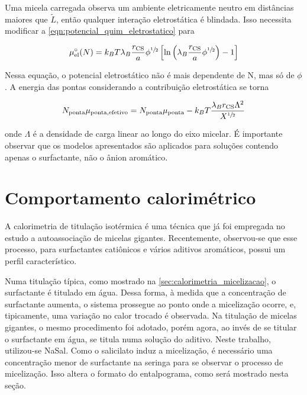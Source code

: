 		Uma micela carregada observa um ambiente eletricamente neutro em distâncias maiores que \(\tilde{L}\), então qualquer interação eletrostática é blindada. Isso necessita modificar a \autoref{eqn:potencial_quim_eletrostatico} para \cite{Giant_Micelles}
		
		\begin{equation}
			\mu_\mathrm{el}^\circ(N) = k_B T \lambda_B \dfrac{r_\mathrm{CS}}{a} \phi^{\sfrac{1}{2}} \left[ \ln \left( \lambda_B \dfrac{r_\mathrm{CS}}{a} \phi^{\sfrac{1}{2}} \right) - 1 \right]
			\label{eqn:potencial_eletrostatico_semidiluido}
		\end{equation}
		
		Nessa equação, o potencial eletrostático não é mais dependente de N, mas só de \(\phi\). A energia das pontas considerando a contribuição eletrostática se torna \cite{Giant_Micelles}
		
		\begin{equation}
			N_\mathrm{ponta}\mu_\mathrm{ponta, efetivo} = N_\mathrm{ponta}\mu_\mathrm{ponta} - k_B T \dfrac{\lambda_B r_\mathrm{CS} \Lambda^2}{X^{\sfrac{1}{2}}}
		\end{equation} 
		
		\noindent onde \(\Lambda\) é a densidade de carga linear ao longo do eixo micelar. É importante observar que os modelos apresentados são aplicados para soluções contendo apenas o surfactante, não o ânion aromático.
		

		\section{Comportamento calorimétrico} 
		\label{sec:micelas_gigantes_calorimetria}
		
		A calorimetria de titulação isotérmica é uma técnica que já foi empregada no estudo a autoassociação de micelas gigantes.\cite{Sarac2009, Sarac2013, Liu2011a, Bijma1998c, Fisicaro2005a} Recentemente, observou-se que esse processo, para surfactantes catiônicos e vários aditivos aromáticos, possui um perfil característico.\cite{Ito2016, Ito2015c}

		Numa titulação típica, como mostrado na \autoref{sec:calorimetria_micelizacao}, o surfactante é titulado em água. Dessa forma, à medida que a concentração de surfactante aumenta, o sistema prossegue ao ponto onde a micelização ocorre, e, tipicamente, uma variação no calor trocado é observada. Na titulação de micelas gigantes, o mesmo procedimento foi adotado, porém agora, ao invés de se titular o surfactante em água, se titula numa solução do aditivo. Neste trabalho, utilizou-se NaSal. Como o salicilato induz a micelização, é necessário uma concentração menor de surfactante na seringa para se observar o processo de micelização. Isso altera o formato do entalpograma, como será mostrado nesta seção.
		
